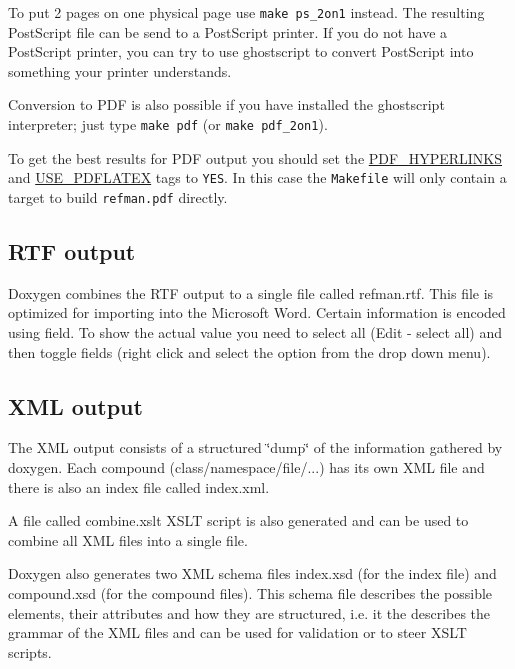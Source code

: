 To put 2 pages on one physical page use {\tt make ps\_\-2on1} instead. The resulting PostScript file can be send to a PostScript printer. If you do not have a PostScript printer, you can try to use ghostscript to convert PostScript into something your printer understands.

Conversion to PDF is also possible if you have installed the ghostscript interpreter; just type {\tt make pdf} (or {\tt make pdf\_\-2on1}).

To get the best results for PDF output you should set the \hyperlink{config_cfg_pdf_hyperlinks}{PDF\_\-HYPERLINKS} and \hyperlink{config_cfg_use_pdflatex}{USE\_\-PDFLATEX} tags to {\tt YES}. In this case the {\tt Makefile} will only contain a target to build {\tt refman.pdf} directly.\hypertarget{starting_rtf_out}{}\subsection{RTF output}\label{starting_rtf_out}
 Doxygen combines the RTF output to a single file called refman.rtf. This file is optimized for importing into the Microsoft Word. Certain information is encoded using field. To show the actual value you need to select all (Edit - select all) and then toggle fields (right click and select the option from the drop down menu).\hypertarget{starting_xml_out}{}\subsection{XML output}\label{starting_xml_out}
 The XML output consists of a structured \char`\"{}dump\char`\"{} of the information gathered by doxygen. Each compound (class/namespace/file/...) has its own XML file and there is also an index file called index.xml.

A file called combine.xslt XSLT script is also generated and can be used to combine all XML files into a single file.

Doxygen also generates two XML schema files index.xsd (for the index file) and compound.xsd (for the compound files). This schema file describes the possible elements, their attributes and how they are structured, i.e. it the describes the grammar of the XML files and can be used for validation or to steer XSLT scripts.


